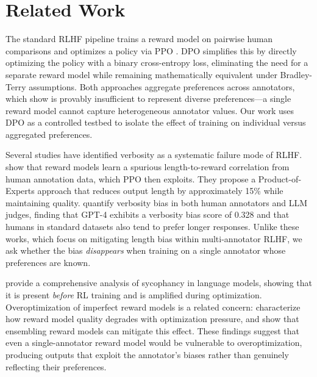 \section{Related Work}
\label{sec:related}

The standard RLHF pipeline trains a reward model on pairwise human comparisons and optimizes a policy via PPO \citep{ouyang2022training, bai2022training, stiennon2020learning}. DPO \citep{rafailov2023direct} simplifies this by directly optimizing the policy with a binary cross-entropy loss, eliminating the need for a separate reward model while remaining mathematically equivalent under Bradley-Terry assumptions. Both approaches aggregate preferences across annotators, which \citet{chakraborty2024maxmin} show is provably insufficient to represent diverse preferences---a single reward model cannot capture heterogeneous annotator values. Our work uses DPO as a controlled testbed to isolate the effect of training on individual versus aggregated preferences.

Several studies have identified verbosity as a systematic failure mode of RLHF. \citet{shen2023loose} show that reward models learn a spurious length-to-reward correlation from human annotation data, which PPO then exploits. They propose a Product-of-Experts approach that reduces output length by approximately 15\% while maintaining quality. \citet{saito2023verbosity} quantify verbosity bias in both human annotators and LLM judges, finding that GPT-4 exhibits a verbosity bias score of 0.328 and that humans in standard datasets also tend to prefer longer responses. Unlike these works, which focus on mitigating length bias within multi-annotator RLHF, we ask whether the bias \emph{disappears} when training on a single annotator whose preferences are known.

\citet{sharma2024towards} provide a comprehensive analysis of sycophancy in language models, showing that it is present \emph{before} RL training and is amplified during optimization. Overoptimization of imperfect reward models is a related concern: \citet{gao2023scaling} characterize how reward model quality degrades with optimization pressure, and \citet{coste2023reward} show that ensembling reward models can mitigate this effect. These findings suggest that even a single-annotator reward model would be vulnerable to overoptimization, producing outputs that exploit the annotator's biases rather than genuinely reflecting their preferences.

